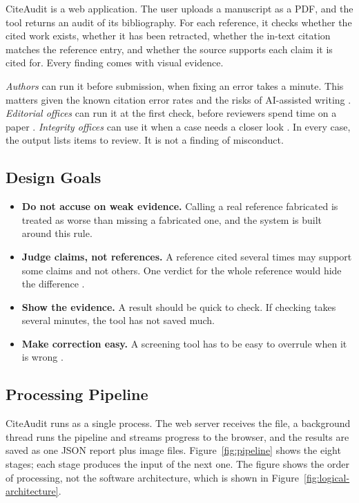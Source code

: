 \documentclass{article}
\begin{document}
CiteAudit is a web application. The user uploads a manuscript as a PDF, and the tool returns an audit of its bibliography. For each reference, it checks whether the cited work exists, whether it has been retracted, whether the in-text citation matches the reference entry, and whether the source supports each claim it is cited for. Every finding comes with visual evidence.

\emph{Authors} can run it before submission, when fixing an error takes a minute. This matters given the known citation error rates \cite{jergas2015,smith2020} and the risks of AI-assisted writing \cite{walters2023}. \emph{Editorial offices} can run it at the first check, before reviewers spend time on a paper \cite{aczel2021}. \emph{Integrity offices} can use it when a case needs a closer look \cite{cope2019}. In every case, the output lists items to review. It is not a finding of misconduct.

\subsection{Design Goals}

\begin{itemize}
\item \textbf{Do not accuse on weak evidence.} Calling a real reference fabricated is treated as worse than missing a fabricated one, and the system is built around this rule.

\item \textbf{Judge claims, not references.} A reference cited several times may support some claims and not others. One verdict for the whole reference would hide the difference \cite{ref2,ref8}.

\item \textbf{Show the evidence.} A result should be quick to check. If checking takes several minutes, the tool has not saved much.

\item \textbf{Make correction easy.} A screening tool has to be easy to overrule when it is wrong \cite{hicks2015}.
\end{itemize}

\subsection{Processing Pipeline}

CiteAudit runs as a single process. The web server receives the file, a background thread runs the pipeline and streams progress to the browser, and the results are saved as one JSON report plus image files. Figure~\ref{fig:pipeline} shows the eight stages; each stage produces the input of the next one. The figure shows the order of processing, not the software architecture, which is shown in Figure~\ref{fig:logical-architecture}.
\end{document}
